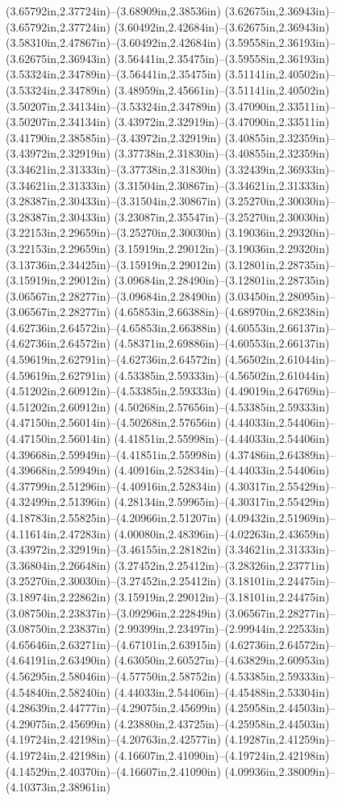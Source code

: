 (3.65792in,2.37724in)--(3.68909in,2.38536in) (3.62675in,2.36943in)--(3.65792in,2.37724in) (3.60492in,2.42684in)--(3.62675in,2.36943in) (3.58310in,2.47867in)--(3.60492in,2.42684in) (3.59558in,2.36193in)--(3.62675in,2.36943in) (3.56441in,2.35475in)--(3.59558in,2.36193in) (3.53324in,2.34789in)--(3.56441in,2.35475in) (3.51141in,2.40502in)--(3.53324in,2.34789in) (3.48959in,2.45661in)--(3.51141in,2.40502in) (3.50207in,2.34134in)--(3.53324in,2.34789in) (3.47090in,2.33511in)--(3.50207in,2.34134in) (3.43972in,2.32919in)--(3.47090in,2.33511in) (3.41790in,2.38585in)--(3.43972in,2.32919in) (3.40855in,2.32359in)--(3.43972in,2.32919in) (3.37738in,2.31830in)--(3.40855in,2.32359in) (3.34621in,2.31333in)--(3.37738in,2.31830in) (3.32439in,2.36933in)--(3.34621in,2.31333in) (3.31504in,2.30867in)--(3.34621in,2.31333in) (3.28387in,2.30433in)--(3.31504in,2.30867in) (3.25270in,2.30030in)--(3.28387in,2.30433in) (3.23087in,2.35547in)--(3.25270in,2.30030in) (3.22153in,2.29659in)--(3.25270in,2.30030in) (3.19036in,2.29320in)--(3.22153in,2.29659in) (3.15919in,2.29012in)--(3.19036in,2.29320in) (3.13736in,2.34425in)--(3.15919in,2.29012in) (3.12801in,2.28735in)--(3.15919in,2.29012in) (3.09684in,2.28490in)--(3.12801in,2.28735in) (3.06567in,2.28277in)--(3.09684in,2.28490in) (3.03450in,2.28095in)--(3.06567in,2.28277in) (4.65853in,2.66388in)--(4.68970in,2.68238in) (4.62736in,2.64572in)--(4.65853in,2.66388in) (4.60553in,2.66137in)--(4.62736in,2.64572in) (4.58371in,2.69886in)--(4.60553in,2.66137in) (4.59619in,2.62791in)--(4.62736in,2.64572in) (4.56502in,2.61044in)--(4.59619in,2.62791in) (4.53385in,2.59333in)--(4.56502in,2.61044in) (4.51202in,2.60912in)--(4.53385in,2.59333in) (4.49019in,2.64769in)--(4.51202in,2.60912in) (4.50268in,2.57656in)--(4.53385in,2.59333in) (4.47150in,2.56014in)--(4.50268in,2.57656in) (4.44033in,2.54406in)--(4.47150in,2.56014in) (4.41851in,2.55998in)--(4.44033in,2.54406in) (4.39668in,2.59949in)--(4.41851in,2.55998in) (4.37486in,2.64389in)--(4.39668in,2.59949in) (4.40916in,2.52834in)--(4.44033in,2.54406in) (4.37799in,2.51296in)--(4.40916in,2.52834in) (4.30317in,2.55429in)--(4.32499in,2.51396in) (4.28134in,2.59965in)--(4.30317in,2.55429in) (4.18783in,2.55825in)--(4.20966in,2.51207in) (4.09432in,2.51969in)--(4.11614in,2.47283in) (4.00080in,2.48396in)--(4.02263in,2.43659in) (3.43972in,2.32919in)--(3.46155in,2.28182in) (3.34621in,2.31333in)--(3.36804in,2.26648in) (3.27452in,2.25412in)--(3.28326in,2.23771in) (3.25270in,2.30030in)--(3.27452in,2.25412in) (3.18101in,2.24475in)--(3.18974in,2.22862in) (3.15919in,2.29012in)--(3.18101in,2.24475in) (3.08750in,2.23837in)--(3.09296in,2.22849in) (3.06567in,2.28277in)--(3.08750in,2.23837in) (2.99399in,2.23497in)--(2.99944in,2.22533in) (4.65646in,2.63271in)--(4.67101in,2.63915in) (4.62736in,2.64572in)--(4.64191in,2.63490in) (4.63050in,2.60527in)--(4.63829in,2.60953in) (4.56295in,2.58046in)--(4.57750in,2.58752in) (4.53385in,2.59333in)--(4.54840in,2.58240in) (4.44033in,2.54406in)--(4.45488in,2.53304in) (4.28639in,2.44777in)--(4.29075in,2.45699in) (4.25958in,2.44503in)--(4.29075in,2.45699in) (4.23880in,2.43725in)--(4.25958in,2.44503in) (4.19724in,2.42198in)--(4.20763in,2.42577in) (4.19287in,2.41259in)--(4.19724in,2.42198in) (4.16607in,2.41090in)--(4.19724in,2.42198in) (4.14529in,2.40370in)--(4.16607in,2.41090in) (4.09936in,2.38009in)--(4.10373in,2.38961in) 